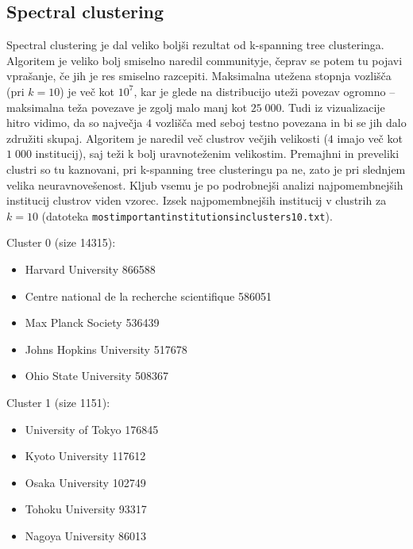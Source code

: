 \documentclass[a4paper,12pt]{article}
\begin{document}
	\subsection{Spectral clustering}
	Spectral clustering je dal veliko boljši rezultat od k-spanning tree clusteringa. Algoritem je veliko bolj smiselno naredil communityje, čeprav se potem tu pojavi vprašanje, če jih je res smiselno razcepiti. Maksimalna utežena stopnja vozlišča (pri $k=10$) je več kot $10^7$, kar je glede na distribucijo uteži povezav ogromno -- maksimalna teža povezave je zgolj malo manj kot $25\;000$. Tudi iz vizualizacije hitro vidimo, da so največja $4$ vozlišča med seboj testno povezana in bi se jih dalo združiti skupaj. Algoritem je naredil več clustrov večjih velikosti ($4$ imajo več kot $1\;000$ institucij), saj teži k bolj uravnoteženim velikostim. Premajhni in preveliki clustri so tu kaznovani, pri k-spanning tree clusteringu pa ne, zato je pri slednjem velika neuravnovešenost. Kljub vsemu je po podrobnejši analizi najpomembnejših institucij clustrov viden vzorec. Izsek najpomembnejših institucij v clustrih za $k=10$ (datoteka \texttt{most\textunderscore important\textunderscore institutions\textunderscore in\textunderscore clusters\textunderscore 10.txt}).
	
	\hspace{1cm}
	
	Cluster 0 (size 14315):
	\begin{itemize}
		\item Harvard University 866588
		\item Centre national de la recherche scientifique 586051
		\item Max Planck Society 536439
		\item Johns Hopkins University 517678
		\item Ohio State University 508367
	\end{itemize}

	\hspace{1cm}	
	
	Cluster 1 (size 1151):
	\begin{itemize}
		\item University of Tokyo 176845
		\item Kyoto University 117612
		\item Osaka University 102749
		\item Tohoku University 93317
		\item Nagoya University 86013
	\end{itemize} 
	
\end{document}
